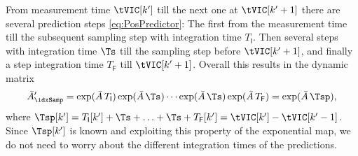 From measurement time $\tVIC[k']$ till the next one at $\tVIC[k'+1]$ there are several prediction steps \eqref{eq:PosPredictor}:
The first from the measurement time till the subsequent sampling step with integration time $T_\mathsf{I}$.
Then several steps with integration time $\Ts$ till the sampling step before $\tVIC[k'+1]$, and finally a step integration time $T_\mathsf{F}$ till $\tVIC[k'+1]$.
Overall this results in the dynamic matrix 
\begin{align}
 \bar{A}'_\idxSamp = \exp(\bar{A}\,T_\mathsf{I}) \exp(\bar{A}\,\Ts) \cdots \exp(\bar{A}\,\Ts) \exp(\bar{A}\,T_\mathsf{F}) = \exp(\bar{A}\,\Tsp), 
\end{align}
where $\Tsp[k'] = T_\mathsf{I}[k'] + \Ts + \ldots + \Ts + T_\mathsf{F}[k'] = \tVIC[k'] - \tVIC[k'-1]$.
Since $\Tsp[k']$ is known and exploiting this property of the exponential map, we do not need to worry about the different integration times of the predictions.

